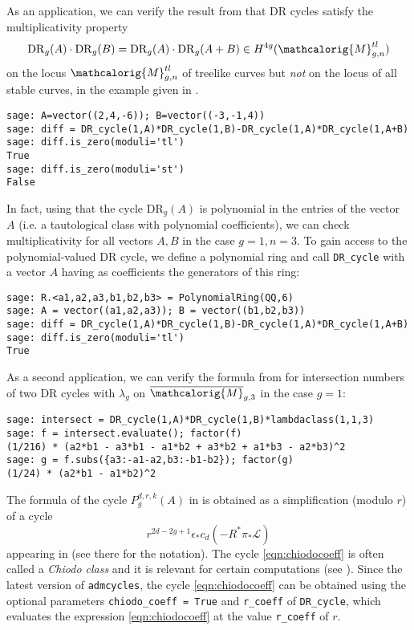 \documentclass[11pt]{article}
\newcommand{\M}{\ensuremath{\overline{\mathcalorig{M}}}}
\newcommand{\DR}{\mathrm{DR}}
\begin{document}
As an application, we can verify the result from \cite{HPS} that DR cycles
satisfy the multiplicativity property
\[\DR_g(A) \cdot \DR_g(B) = \DR_g(A) \cdot \DR_g(A+B) \in H^{4g}(\mathcalorig{M}_{g,n}^{tl})\]
on the locus $\mathcalorig{M}_{g,n}^{tl}$ of treelike curves but \emph{not} on the locus of all stable curves, in the example given in \cite[Section 8]{HPS}.
\begin{lstlisting}
sage: A=vector((2,4,-6)); B=vector((-3,-1,4))
sage: diff = DR_cycle(1,A)*DR_cycle(1,B)-DR_cycle(1,A)*DR_cycle(1,A+B)
sage: diff.is_zero(moduli='tl')
True
sage: diff.is_zero(moduli='st')
False
\end{lstlisting}
In fact, using that the cycle $\DR_g(A)$ is polynomial in the entries of the vector $A$ (i.e. a tautological class with polynomial coefficients), we can check multiplicativity for all vectors $A,B$ in the case $g=1, n=3$. To gain access to the polynomial-valued DR cycle, we define a polynomial ring and call \verb|DR_cycle| with a vector $A$ having as coefficients the generators of this ring:
\begin{lstlisting}
sage: R.<a1,a2,a3,b1,b2,b3> = PolynomialRing(QQ,6)
sage: A = vector((a1,a2,a3)); B = vector((b1,b2,b3))
sage: diff = DR_cycle(1,A)*DR_cycle(1,B)-DR_cycle(1,A)*DR_cycle(1,A+B)
sage: diff.is_zero(moduli='tl')
True
\end{lstlisting}
As a second application, we can verify the formula from \cite[Theorem 2.1]{rossiburyak} for intersection numbers of two DR cycles with $\lambda_g$ on $\M_{g,3}$ in the case $g=1$:
\begin{lstlisting}
sage: intersect = DR_cycle(1,A)*DR_cycle(1,B)*lambdaclass(1,1,3)
sage: f = intersect.evaluate(); factor(f)
(1/216) * (a2*b1 - a3*b1 - a1*b2 + a3*b2 + a1*b3 - a2*b3)^2
sage: g = f.subs({a3:-a1-a2,b3:-b1-b2}); factor(g)
(1/24) * (a2*b1 - a1*b2)^2
\end{lstlisting}
The formula of the cycle $P_g^{d,r,k}(A)$ in \cite{Janda2016Double-ramifica} is obtained as a simplification (modulo $r$) of a cycle
\begin{equation} \label{eqn:chiodocoeff}
r^{2d-2g+1} \epsilon_* c_d(- R^* \pi_* \mathcal{L})
\end{equation}
appearing in \cite[Corollary 4, Proposition 5]{Janda2016Double-ramifica} (see there for the notation). The cycle \eqref{eqn:chiodocoeff} is often called a \emph{Chiodo class} and it is relevant for certain computations (see \cite{Hurwitznum1, Hurwitznum2}). Since the latest version of \texttt{admcycles}, the cycle \eqref{eqn:chiodocoeff} can be obtained using the optional parameters \verb|chiodo_coeff = True| and \verb|r_coeff| of \verb|DR_cycle|, which evaluates the expression \eqref{eqn:chiodocoeff} at the value \verb|r_coeff| of $r$.
\end{document}
